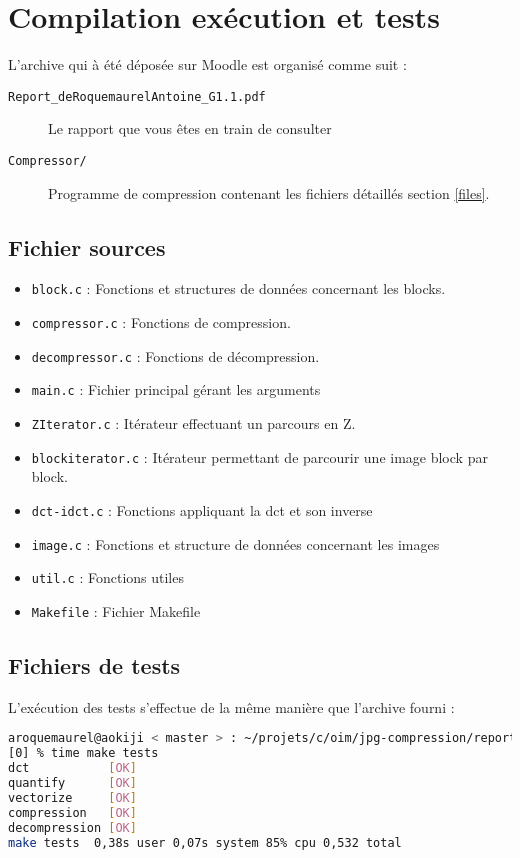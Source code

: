 \documentclass[a4paper, 11pt]{article}
\begin{document}
	\maketitle
	\section{Compilation exécution et tests}
	L'archive qui à été déposée sur Moodle est organisé comme suit : 
	\begin{description}
		\item[\texttt{Report\_deRoquemaurelAntoine\_G1.1.pdf}] Le rapport que vous êtes en train de consulter
		\item[\texttt{Compressor/}] Programme de compression contenant les fichiers détaillés section \ref{files}. 
	\end{description}
	\subsection{Fichier sources}	
	\begin{itemize}
		\item \texttt{block.c} : Fonctions et structures de données concernant les blocks.
		\item \texttt{compressor.c} : Fonctions de compression.
		\item \texttt{decompressor.c} : Fonctions de décompression.
		\item \texttt{main.c} : Fichier principal gérant les arguments
		\item \texttt{ZIterator.c} : Itérateur effectuant un parcours en Z.
		\item \texttt{blockiterator.c} : Itérateur permettant de parcourir une image block par block.
		\item \texttt{dct-idct.c} : Fonctions appliquant la dct et son inverse
		\item \texttt{image.c} : Fonctions et structure de données concernant les images
		\item \texttt{util.c} : Fonctions utiles
		\item \texttt{Makefile} : Fichier Makefile
	\end{itemize}

	\subsection{Fichiers de tests}
	L'exécution des tests s'effectue de la même manière que l'archive fourni : 
	\begin{lstlisting}[language=Bash]
aroquemaurel@aokiji < master > : ~/projets/c/oim/jpg-compression/report
[0] % time make tests 
dct           [OK]
quantify      [OK]
vectorize     [OK]
compression   [OK]
decompression [OK]
make tests  0,38s user 0,07s system 85% cpu 0,532 total
	\end{lstlisting}
	\label{files}
\end{document}
